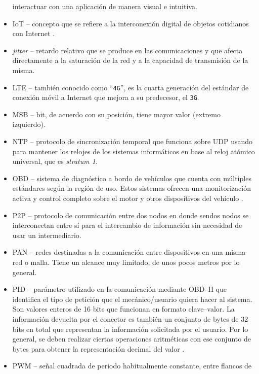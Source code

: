 \begin{itemize}
        interactuar con una aplicación de manera visual e intuitiva.
  \item \ac{IoT} -- concepto que se refiere a la interconexión digital de objetos 
        cotidianos con Internet \cite{InternetCosas2021}.
  \item \textit{jitter} -- retardo relativo que se produce en las comunicaciones
        y que afecta directamente a la saturación de la red y a la capacidad de
        transmisión de la misma.
  \item \ac{LTE} -- también conocido como ``\texttt{4G}'', es la cuarta generación
        del estándar de conexión móvil a Internet que mejora a su predecesor, el \texttt{3G}.
  \item \ac{MSB} -- bit, de acuerdo con su posición, tiene mayor valor (extremo izquierdo).
  \item \ac{NTP} -- protocolo de sincronización temporal que funciona sobre UDP usando para mantener
        los relojes de los sistemas informáticos en base al reloj atómico universal, que
        es \textit{stratum 1}.
  \item \ac{OBD} -- sistema de diagnóstico a bordo de vehículos que cuenta con múltiples estándares según la región de uso. Estos
        sistemas ofrecen una monitorización activa y control completo
        sobre el motor y otros dispositivos del vehículo \cite{OBD2021}.
  \item \ac{P2P} -- protocolo de comunicación entre dos nodos en donde sendos nodos se
        interconectan entre sí para el intercambio de información sin necesidad de usar
        un intermediario.
  \item \ac{PAN} -- redes destinadas a la comunicación entre dispositivos en una
        misma red o malla. Tiene un alcance muy limitado, de unos pocos metros por
        lo general.
  \item \ac{PID} -- parámetro utilizado en la comunicación mediante \ac{OBD}--II que
        identifica el tipo de petición que el mecánico/usuario quiera hacer al sistema.
        Son valores enteros de 16 bits que funcionan en formato clave--valor. La información
        devuelta por el conector es también un conjunto de bytes de 32 bits en total que
        representan la información solicitada por el usuario. Por lo general, se deben
        realizar ciertas operaciones aritméticas con ese conjunto de bytes para obtener
        la representación decimal del valor \cite{OBDIIPIDs2021}.
  \item \ac{PWM} -- señal cuadrada de periodo habitualmente constante, entre flancos de

\end{itemize}
